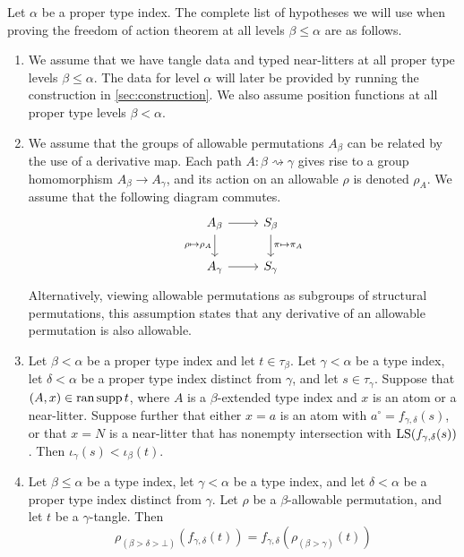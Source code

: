 Let \( \alpha \) be a proper type index.
The complete list of hypotheses we will use when proving the freedom of action theorem at all levels \( \beta \leq \alpha \) are as follows.
\begin{enumerate}
    \item We assume that we have tangle data and typed near-litters at all proper type levels \( \beta \leq \alpha \).
    The data for level \( \alpha \) will later be provided by running the construction in \cref{sec:construction}.
    We also assume position functions at all proper type levels \( \beta < \alpha \).
    \item We assume that the groups of allowable permutations \( A_\beta \) can be related by the use of a derivative map.
    Each path \( A : \beta \rightsquigarrow \gamma \) gives rise to a group homomorphism \( A_\beta \to A_\gamma \), and its action on an allowable \( \rho \) is denoted \( \rho_A \).
    We assume that the following diagram commutes.
    \[\begin{tikzcd}
        {A_\beta} & {S_\beta} \\
        {A_\gamma} & {S_\gamma}
        \arrow[from=1-1, to=1-2]
        \arrow["{\pi \mapsto \pi_A}", from=1-2, to=2-2]
        \arrow["{\rho \mapsto \rho_A}"', from=1-1, to=2-1]
        \arrow[from=2-1, to=2-2]
    \end{tikzcd}\]
    Alternatively, viewing allowable permutations as subgroups of structural permutations, this assumption states that any derivative of an allowable permutation is also allowable.
    \item Let \( \beta < \alpha \) be a proper type index and let \( t \in \tau_\beta \).
    Let \( \gamma < \alpha \) be a type index, let \( \delta < \alpha \) be a proper type index distinct from \( \gamma \), and let \( s \in \tau_\gamma \).
    Suppose that \( (A, x) \in \operatorname{ran} \operatorname{supp} t \), where \( A \) is a \( \beta \)-extended type index and \( x \) is an atom or a near-litter.
    Suppose further that either \( x = a \) is an atom with \( a^\circ = f_{\gamma,\delta}(s) \), or that \( x = N \) is a near-litter that has nonempty intersection with \( \operatorname{LS}(f_{\gamma,\delta}(s)) \).
    Then \( \iota_\gamma(s) < \iota_\beta(t) \).
    \item Let \( \beta \leq \alpha \) be a type index, let \( \gamma < \alpha \) be a type index, and let \( \delta < \alpha \) be a proper type index distinct from \( \gamma \).
    Let \( \rho \) be a \( \beta \)-allowable permutation, and let \( t \) be a \( \gamma \)-tangle.
    Then
    \[ \rho_{(\beta > \delta > \bot)}(f_{\gamma,\delta}(t)) = f_{\gamma,\delta}(\rho_{(\beta > \gamma)}(t)) \]

\end{enumerate}
